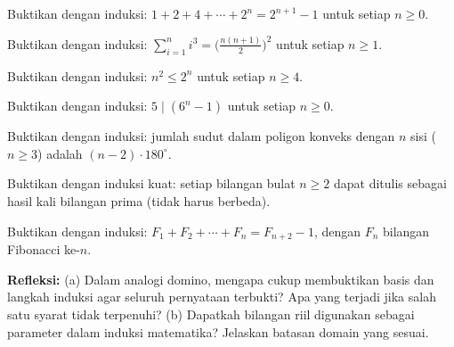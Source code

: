 \documentclass[../main]{subfiles}
\begin{document}
\begin{latihan}
  \item Buktikan dengan induksi: $1 + 2 + 4 + \cdots + 2^n = 2^{n+1} - 1$ untuk setiap $n \geq 0$.
  \item Buktikan dengan induksi: $\sum_{i=1}^{n} i^3 = \bigl(\frac{n(n+1)}{2}\bigr)^2$ untuk setiap $n \geq 1$.
  \item Buktikan dengan induksi: $n^2 \leq 2^n$ untuk setiap $n \geq 4$.
  \item Buktikan dengan induksi: $5 \mid (6^n - 1)$ untuk setiap $n \geq 0$.
  \item Buktikan dengan induksi: jumlah sudut dalam poligon konveks dengan $n$ sisi ($n \geq 3$) adalah $(n-2) \cdot 180^\circ$.
  \item Buktikan dengan induksi kuat: setiap bilangan bulat $n \geq 2$ dapat ditulis sebagai hasil kali bilangan prima (tidak harus berbeda).
  \item Buktikan dengan induksi: $F_1 + F_2 + \cdots + F_n = F_{n+2} - 1$, dengan $F_n$ bilangan Fibonacci ke-$n$.
  \item \textbf{Refleksi:} (a) Dalam analogi domino, mengapa cukup membuktikan basis dan langkah induksi agar seluruh pernyataan terbukti? Apa yang terjadi jika salah satu syarat tidak terpenuhi? (b) Dapatkah bilangan riil digunakan sebagai parameter dalam induksi matematika? Jelaskan batasan domain yang sesuai.
\end{latihan}

\end{document}
